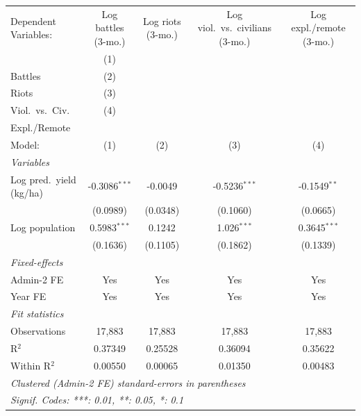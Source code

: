 
\begingroup
\centering
\begin{tabular}{lcccc}
   \tabularnewline \midrule \midrule
   Dependent Variables:      & Log battles (3-mo.) & Log riots (3-mo.) & Log viol.\ vs.~civilians (3-mo.)  & Log expl./remote (3-mo.)\\  
                             & (1)\\Battles        & (2)\\Riots        & (3)\\Viol.\ vs.\ Civ.             & (4)\\Expl./Remote \\     
   Model:                    & (1)                 & (2)               & (3)                               & (4)\\  
   \midrule
   \emph{Variables}\\
   Log pred.\ yield (kg/ha)  & -0.3086$^{***}$     & -0.0049           & -0.5236$^{***}$                   & -0.1549$^{**}$\\   
                             & (0.0989)            & (0.0348)          & (0.1060)                          & (0.0665)\\   
   Log population            & 0.5983$^{***}$      & 0.1242            & 1.026$^{***}$                     & 0.3645$^{***}$\\   
                             & (0.1636)            & (0.1105)          & (0.1862)                          & (0.1339)\\   
   \midrule
   \emph{Fixed-effects}\\
   Admin-2 FE                & Yes                 & Yes               & Yes                               & Yes\\  
   Year FE                   & Yes                 & Yes               & Yes                               & Yes\\  
   \midrule
   \emph{Fit statistics}\\
   Observations              & 17,883              & 17,883            & 17,883                            & 17,883\\  
   R$^2$                     & 0.37349             & 0.25528           & 0.36094                           & 0.35622\\  
   Within R$^2$              & 0.00550             & 0.00065           & 0.01350                           & 0.00483\\  
   \midrule \midrule
   \multicolumn{5}{l}{\emph{Clustered (Admin-2 FE) standard-errors in parentheses}}\\
   \multicolumn{5}{l}{\emph{Signif. Codes: ***: 0.01, **: 0.05, *: 0.1}}\\
\end{tabular}
 

